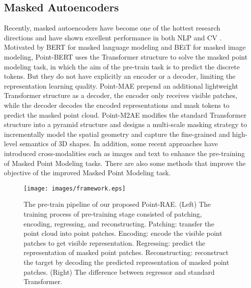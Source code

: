 \documentclass[sigconf, screen]{acmart}
\begin{document}
\subsection{Masked Autoencoders}
Recently, masked autoencoders have become one of the hottest research directions and have shown excellent performance in both NLP \cite{devlin2018bert, liu2019roberta} and CV \cite{xie2022simmim, bao2021beit, chen2022context}. 
Motivated by BERT \cite{devlin2018bert} for masked language modeling and BEiT \cite{bao2021beit} for masked image modeling, 
Point-BERT \cite{yu2022point} uses the Transformer structure to solve the masked point modeling task, in which the aim of the pre-train task is to predict the discrete tokens.  But they do not have explicitly an encoder or a decoder, limiting the representation learning quality. Point-MAE \cite{pang2022masked}  prepend an additional lightweight Transformer structure as a decoder, the encoder only receives visible patches, while the decoder decodes the encoded representations and mask tokens to predict the masked point cloud. Point-M2AE \cite{zhang2022point} modifies the standard Transformer structure into a pyramid structure and designs a multi-scale masking strategy to incrementally model the spatial geometry and capture the fine-grained and high-level semantics of 3D shapes. 
In addition, some recent approaches \cite{dong2022autoencoders, qi2023contrast, zhang2022learning} have introduced cross-modalities such as images and text to enhance the pre-training of Masked Point Modeling tasks.
There are also some methods \cite{zhang2022masked, liu2022masked} that improve the objective of the improved Masked Point Modeling task. 







\begin{figure*}[!t]
  \centering
  \texttt{[image: images/framework.eps]}
\caption{The pre-train pipeline of our proposed Point-RAE.
  (Left) The training process of pre-training stage consisted of patching, encoding, regressing, and reconstructing. 
  Patching: transfer the point cloud into point patches.
Encoding: encode the visible point patches to get visible representation.
Regressing: predict the representation of masked point patches.
Reconstructing: reconstruct the target by decoding the predicted representation of masked point patches.
  (Right) The difference between regressor and standard Transformer.}
  \label{framework}
\end{figure*}
\end{document}
